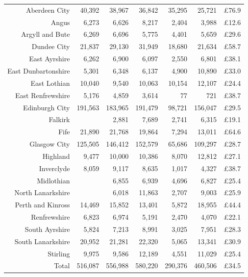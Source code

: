 \documentclass[
  12pt,
]{article}
\begin{document}
\begin{longtable}[t]{rrrrrrr}
\endfoot
\bottomrule
\endlastfoot
Aberdeen City & 40,392 & 38,967 & 36,842 & 35,295 & 25,721 & £76.9\\
Angus & 6,273 & 6,626 & 8,217 & 2,404 & 3,988 & £12.6\\
Argyll and Bute & 6,269 & 6,696 & 5,775 & 4,401 & 5,659 & £29.6\\
Dundee City & 21,837 & 29,130 & 31,949 & 18,680 & 21,634 & £58.7\\
East Ayrshire & 6,262 & 6,900 & 6,097 & 2,550 & 6,801 & £38.1\\
East Dunbartonshire & 5,301 & 6,348 & 6,137 & 4,900 & 10,890 & £33.0\\
East Lothian & 10,040 & 9,540 & 10,063 & 10,154 & 12,107 & £24.4\\
East Renfrewshire & 5,176 & 4,859 & 3,614 & 77 & 721 & £38.7\\
Edinburgh City & 191,563 & 183,965 & 191,479 & 98,721 & 156,047 & £29.5\\
Falkirk &  & 2,881 & 7,689 & 2,741 & 6,315 & £19.1\\
Fife & 21,890 & 21,768 & 19,864 & 7,294 & 13,011 & £64.6\\
Glasgow City & 125,505 & 146,412 & 152,579 & 65,686 & 109,297 & £28.7\\
Highland & 9,477 & 10,000 & 10,386 & 8,070 & 12,812 & £27.1\\
Inverclyde & 8,059 & 9,117 & 8,635 & 1,017 & 4,327 & £38.7\\
Midlothian &  & 6,855 & 6,939 & 4,696 & 6,827 & £25.4\\
North Lanarkshire &  & 6,018 & 11,863 & 2,707 & 9,003 & £25.9\\
Perth and Kinross & 14,469 & 15,852 & 13,401 & 5,872 & 18,955 & £44.4\\
Renfrewshire & 6,823 & 6,974 & 5,191 & 2,470 & 4,070 & £22.1\\
South Ayrshire & 5,824 & 7,213 & 8,991 & 3,025 & 7,951 & £28.3\\
South Lanarkshire & 20,952 & 21,281 & 22,320 & 5,065 & 13,341 & £30.9\\
Stirling & 9,975 & 9,586 & 12,189 & 4,551 & 11,029 & £25.4\\
\midrule
Total & 516,087 & 556,988 & 580,220 & 290,376 & 460,506 & £34.5\\*
\end{longtable}
\endgroup{}
\newpage
\begingroup\fontsize{10}{12}\selectfont
\end{document}
